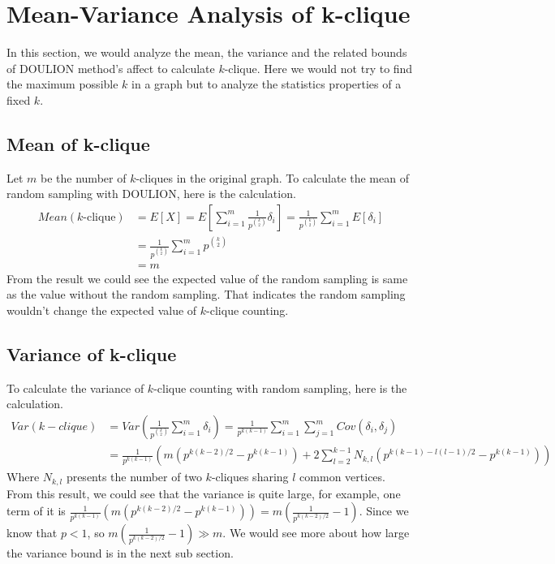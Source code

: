 \section{Mean-Variance Analysis of k-clique}\label{sec:var}
In this section, we would analyze the mean, the variance and the related bounds of DOULION method's affect to calculate $k$-clique. Here we would not try to find the maximum possible $k$ in a graph but to analyze the statistics properties of a fixed $k$.
\subsection{Mean of k-clique}
Let $m$ be the number of $k$-cliques in the original graph. To calculate the mean of random sampling with DOULION, here is the calculation.\\
\[
        \begin{split}
Mean(k\text{-clique}) &= E[X] = E[\sum_{i=1}^{m} \frac{1}{p^{\binom{k}{2}}} \delta_i] = \frac{1}{p^{\binom{k}{2}}} \sum_{i=1}^{m}  E[\delta_i] \\
&= \frac{1}{p^{\binom{k}{2}}} \sum_{i=1}^{m} p^{\binom{k}{2}} \\
&= m
        \end{split}
\]
From the result we could see the expected value of the random sampling is same as the value without the random sampling. That indicates the random sampling wouldn't change the expected value of $k$-clique counting.
\subsection{Variance of k-clique}
To calculate the variance of $k$-clique counting with random sampling, here is the calculation. \\
\[
        \begin{split}
Var(k-clique) &= Var( \frac{1}{p^{\binom{k}{2}}} \sum_{i=1}^{m} \delta_i ) = \frac{1}{p^{k(k-1)}} \sum_{i=1}^{m} \sum_{j=1}^{m} Cov(\delta_i, \delta_j) \\
&= \frac{1}{p^{k(k-1)}}(m(p^{k(k-2)/2} - p^{k(k-1)}) + 2\sum_{l=2}^{k-1} N_{k,l}(p^{k(k-1)-l(l-1)/2} - p^{k(k-1)}))
        \end{split}
\]
Where $N_{k,l}$ presents the number of two $k$-cliques sharing $l$ common vertices. \\
From this result, we could see that the variance is quite large, for example, one term of it is $\frac{1}{p^{k(k-1)}}(m(p^{k(k-2)/2} - p^{k(k-1)})) = m(\frac{1}{p^{k(k-2)/2}}-1)$. Since we know that $p < 1$, so $m(\frac{1}{p^{k(k-2)/2}}-1) \gg m$. We would see more about how large the variance bound is in the next sub section.

